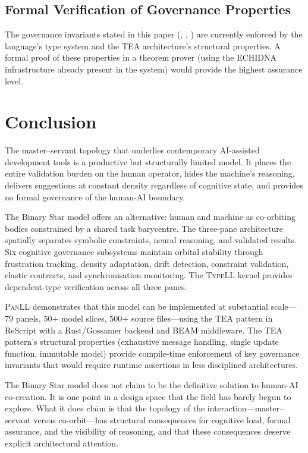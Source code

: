 \documentclass[11pt,a4paper]{article}
\newcommand{\panll}{\textsc{PanLL}}
\newcommand{\typell}{\textsc{TypeLL}}
\newcommand{\tea}{\textsc{TEA}}
\begin{document}
\subsection{Formal Verification of Governance Properties}

The governance invariants stated in this paper (,
, ) are currently
enforced by the language's type system and the \tea{} architecture's
structural properties. A formal proof of these properties in a
theorem prover (using the ECHIDNA infrastructure already present
in the system) would provide the highest assurance level.

\section{Conclusion}\label{sec:conclusion}

The master--servant topology that underlies contemporary AI-assisted
development tools is a productive but structurally limited model.
It places the entire validation burden on the human operator,
hides the machine's reasoning, delivers suggestions at constant
density regardless of cognitive state, and provides no formal
governance of the human-AI boundary.

The Binary Star model offers an alternative: human and machine as
co-orbiting bodies constrained by a shared task barycentre. The
three-pane architecture spatially separates symbolic constraints,
neural reasoning, and validated results. Six cognitive governance
subsystems maintain orbital stability through frustration tracking,
density adaptation, drift detection, constraint validation, elastic
contracts, and synchronisation monitoring. The \typell{} kernel
provides dependent-type verification across all three panes.

\panll{} demonstrates that this model can be implemented at
substantial scale---79 panels, 50+ model slices, 500+ source
files---using the \tea{} pattern in ReScript with a Rust/Gossamer
backend and BEAM middleware. The \tea{} pattern's structural
properties (exhaustive message handling, single update function,
immutable model) provide compile-time enforcement of key governance
invariants that would require runtime assertions in less
disciplined architectures.

The Binary Star model does not claim to be the definitive solution
to human-AI co-creation. It is one point in a design space that
the field has barely begun to explore. What it does claim is that
the topology of the interaction---master--servant versus
co-orbit---has structural consequences for cognitive load, formal
assurance, and the visibility of reasoning, and that these
consequences deserve explicit architectural attention.
\end{document}
